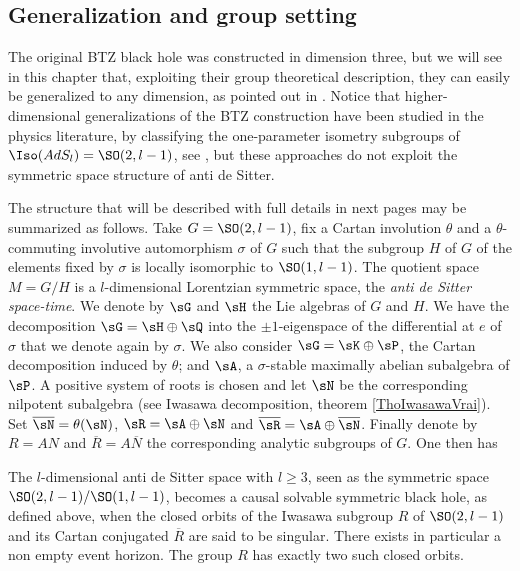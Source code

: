 \subsection{Generalization and group setting}
\label{SubSecGEneBHGrop}

The original BTZ black hole was constructed in dimension three, but we will see in this chapter that, exploiting their group theoretical description, they can easily be generalized to any dimension, as pointed out in \cite{BDRS,lcTNAdS}.  Notice that higher-dimensional generalizations of the BTZ construction have been studied in the physics literature, by classifying the one-parameter isometry subgroups of $\Iso(AdS_l)=\SO(2,l-1)$, see \cite{Figueroa,AdSBH,Madden,Banados:1997df,Aminneborg,HolstPeldan}, but these approaches do not exploit the symmetric space structure of anti de Sitter.

The structure that will be described with full details in next pages may be summarized as follows. Take $G=\SO(2,l-1)$, fix a Cartan involution $\theta$ and a $\theta$-commuting involutive automorphism $\sigma$ of $G$ such that the subgroup $H$ of $G$ of the elements fixed by $\sigma$ is locally isomorphic to $\SO(1,l-1)$. The quotient space $M=G/H$ is a $l$-dimensional Lorentzian symmetric space, the {\sl anti de Sitter space-time}.  We denote by $\sG$ and $\sH$ the Lie algebras of $G$ and $H$. We have the decomposition $\sG=\sH\oplus\sQ$ into the $\pm 1$-eigenspace  of the differential at $e$ of $\sigma$ that we denote again by $\sigma$.  We also consider $\sG=\sK\oplus\sP$, the Cartan decomposition induced by $\theta$; and $\sA$, a $\sigma$-stable maximally abelian subalgebra of $\sP$. A positive system of roots is chosen  and let $\sN$ be the corresponding nilpotent subalgebra (see Iwasawa decomposition, theorem \ref{ThoIwasawaVrai}).  Set  $\overline{\sN}=\theta(\sN)$, $\sR=\sA\oplus\sN$ and $\overline{\sR}=\sA\oplus\overline{\sN}$. Finally denote by $R=AN$ and $\overline{R}=A\overline{N}$ the corresponding analytic subgroups of $G$.  One then has

\begin{theorem}
The $l$-dimensional anti de Sitter space with $l\geq 3$, seen as the symmetric space $\SO(2,l-1)/\SO(1,l-1)$, becomes a causal solvable symmetric black hole, as defined above, when the closed orbits of the Iwasawa subgroup $R$ of $\SO(2,l-1)$ and its Cartan conjugated $\overline{ R }$ are said to be singular. There exists in particular a non empty event horizon. The group $R$ has exactly two such closed orbits. 
\label{ThoLeBut}
 \end{theorem}

